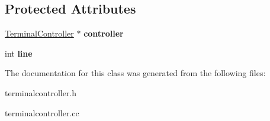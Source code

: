\subsection*{Protected Attributes}
\begin{DoxyCompactItemize}
\item 
\hypertarget{classTerminalController_1_1KeyboardRepoll_a5eadc6ba6a2de90cfba9b5f6fab7c422}{
\hyperlink{classTerminalController}{TerminalController} $\ast$ {\bfseries controller}}
\label{classTerminalController_1_1KeyboardRepoll_a5eadc6ba6a2de90cfba9b5f6fab7c422}

\item 
\hypertarget{classTerminalController_1_1KeyboardRepoll_a6625ea420771847109a74dbe775de5d4}{
int {\bfseries line}}
\label{classTerminalController_1_1KeyboardRepoll_a6625ea420771847109a74dbe775de5d4}

\end{DoxyCompactItemize}


The documentation for this class was generated from the following files:\begin{DoxyCompactItemize}
\item 
terminalcontroller.h\item 
terminalcontroller.cc\end{DoxyCompactItemize}

